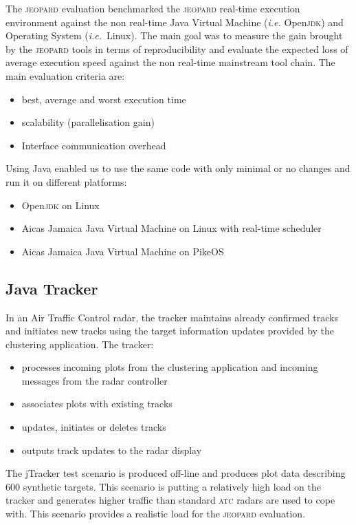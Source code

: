 \documentclass{sig-alternate}
\newcommand{\acronym}[1]{\textsc{#1}}
\newcommand{\ie}{\textit{i.e.}}
\begin{document}
The \acronym{jeopard} evaluation benchmarked the \acronym{jeopard} real-time execution environment against the non real-time Java Virtual Machine (\ie{} Open\acronym{jdk}) and Operating System (\ie\ Linux). The main goal was to measure the gain brought by the \acronym{jeopard} tools in terms of reproducibility and evaluate the expected loss of average execution speed against the non real-time mainstream tool chain. The main evaluation criteria are:
\begin{itemize}
\item best, average and worst execution time
\item scalability (parallelisation gain)
\item Interface communication overhead
\end{itemize}

Using Java enabled us to use the same code with only minimal or no changes and run it on different platforms:
\begin{itemize}
\item Open\acronym{jdk} on Linux 
\item Aicas Jamaica Java Virtual Machine on Linux with real-time scheduler
\item Aicas Jamaica Java Virtual Machine on PikeOS 
\end{itemize}

\subsection{Java Tracker}
In an Air Traffic Control radar, 
the tracker maintains already confirmed tracks 
and initiates new tracks using the target information updates 
provided by the clustering application. The tracker:
\begin{itemize}
\item processes incoming plots from the clustering application and incoming  messages from the radar controller
\item associates plots with existing tracks
\item updates, initiates or deletes tracks 
\item outputs track updates to the radar display
\end{itemize}

The jTracker test scenario is produced off-line 
and produces plot data describing 600 synthetic targets. 
This scenario is putting a relatively high load 
on the tracker and generates higher traffic 
than standard \acronym{atc} radars are used to cope with. 
This scenario provides a realistic load for the \acronym{jeopard} evaluation.
\end{document}
